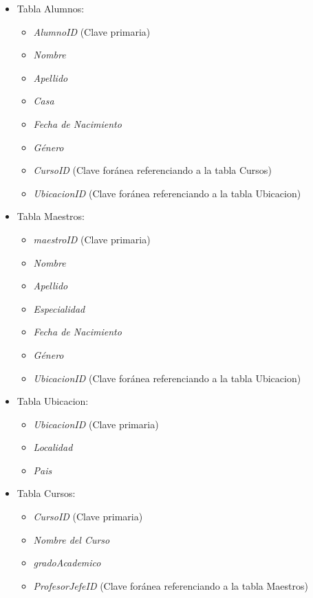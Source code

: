 \begin{itemize}
    \item Tabla Alumnos:
      \begin{itemize}
        \item \textit{AlumnoID} (Clave primaria)
        \item \textit{Nombre}
        \item \textit{Apellido}
        \item \textit{Casa} 
        \item \textit{Fecha de Nacimiento}
        \item \textit{Género}
        \item \textit{CursoID} (Clave foránea referenciando a la tabla Cursos)
        \item \textit{UbicacionID} (Clave foránea referenciando a la tabla Ubicacion)
      \end{itemize}
    \item Tabla Maestros:
      \begin{itemize}
        \item \textit{maestroID} (Clave primaria)
        \item \textit{Nombre}
        \item \textit{Apellido}
        \item \textit{Especialidad}
        \item \textit{Fecha de Nacimiento}
        \item \textit{Género}
        \item \textit{UbicacionID} (Clave foránea referenciando a la tabla Ubicacion)
      \end{itemize}
    \item Tabla Ubicacion:
      \begin{itemize}
        \item \textit{UbicacionID} (Clave primaria)
        \item \textit{Localidad}
        \item \textit{Pais}
      \end{itemize}
    \item Tabla Cursos:
      \begin{itemize}
        \item \textit{CursoID} (Clave primaria)
        \item \textit{Nombre del Curso}
        \item \textit{gradoAcademico} 
        \item \textit{ProfesorJefeID} (Clave foránea referenciando a la tabla Maestros)

\end{itemize}
\end{itemize}
